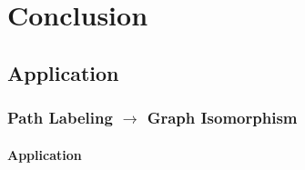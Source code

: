 \documentclass[12pt,
               color={usenames,   %
                      dvipsnames},%
                    ]{beamer}
\begin{document}



  







\section{Conclusion}
\subsection{Application}
\frame
{
    \frametitle{Path Labeling $\rightarrow$  Graph Isomorphism}
    \framesubtitle{Application} 


 \note{}
}
\end{document}
